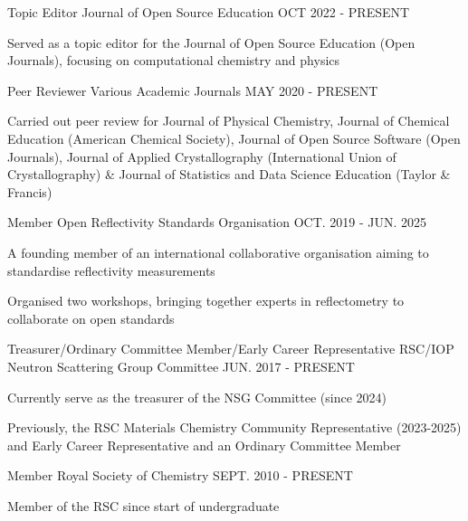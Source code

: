 \begin{cventries}
  \cventry
    {Topic Editor}
    {Journal of Open Source Education}
    {}
    {OCT 2022 - PRESENT}
    {
    	\begin{cvitems}
	    \item{Served as a topic editor for the Journal of Open Source Education (Open Journals), focusing on computational chemistry and physics}
	\end{cvitems}
    }
  \cventry
    {Peer Reviewer}
    {Various Academic Journals}
    {}
    {MAY 2020 - PRESENT}
    {
        \begin{cvitems}
            \item{Carried out peer review for Journal of Physical Chemistry, Journal of Chemical Education (American Chemical Society), Journal of Open Source Software (Open Journals), Journal of Applied Crystallography (International Union of Crystallography) \& Journal of Statistics and Data Science Education (Taylor \& Francis)}
        \end{cvitems}
    }
  \cventry
    {Member}
    {Open Reflectivity Standards Organisation}
    {}
    {OCT. 2019 - JUN. 2025}
    {
      \begin {cvitems}
        \item {A founding member of an international collaborative organisation aiming to standardise reflectivity measurements}
        \item {Organised two workshops, bringing together experts in reflectometry to collaborate on open standards}
      \end {cvitems}
    }
  \cventry
    {Treasurer/Ordinary Committee Member/Early Career Representative}
    {RSC/IOP Neutron Scattering Group Committee}
    {}
    {JUN. 2017 - PRESENT}
    {
      \begin{cvitems}
      	\item {Currently serve as the treasurer of the NSG Committee (since 2024)}
        \item {Previously, the RSC Materials Chemistry Community Representative (2023-2025) and Early Career Representative and an Ordinary Committee Member}
	  \end{cvitems}
	}
  \cventry
    {Member}
    {Royal Society of Chemistry}
    {}
    {SEPT. 2010 - PRESENT}
    {
      \begin{cvitems}
      	\item {Member of the RSC since start of undergraduate}
      \end{cvitems}
    }
\end{cventries}
